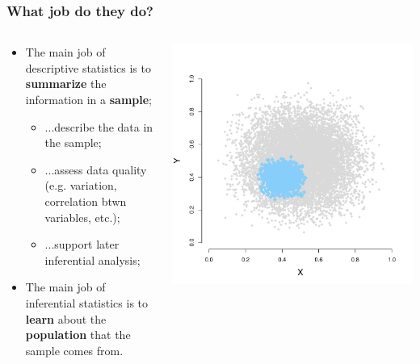 \documentclass[aspectratio=169]{beamer}
\theoremstyle{principle}
\begin{document}
\begin{frame}
\frametitle{What job do they do?}

\begin{columns}
\begin{column}{0.5\textwidth}

\begin{itemize}
\item The main job of descriptive statistics is to \textbf{summarize} the information in a \textbf{sample};
\begin{itemize}
\item ...describe the data in the sample;
\item ...assess data quality (e.g. variation, correlation btwn variables, etc.);
\item ...support later inferential analysis;
\end{itemize}
\bigskip
\bigskip
\item The main job of inferential statistics is to \textbf{learn} about the \textbf{population} that the sample comes from.
\end{itemize}

\end{column}
\begin{column}{0.5\textwidth}
\includegraphics[scale=0.4]{point_cloud.pdf}
\end{column}
\end{columns}

\end{frame}
\end{document}
